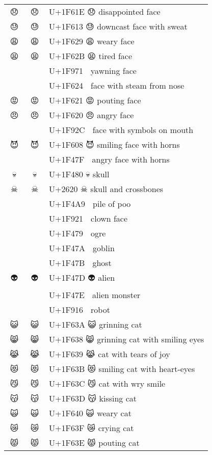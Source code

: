 \documentclass[a4paper,12pt]{article}
\newcommand{\fontA}[1]{{\fontspec[RawFeature={mode=harf,+dist,+ccmp}]{Segoe UI Emoji} #1}}
\newcommand{\fontB}[1]{{\fontspec[RawFeature={mode=harf,+dist,+ccmp}]{Noto Color Emoji} #1}}
\begin{document}
\begin{longtable}[c]{ccp{0.8\linewidth}}
\fontA{😞}&\fontB{😞}&U+1F61E 😞 disappointed face\\
\fontA{😓}&\fontB{😓}&U+1F613 😓 downcast face with sweat\\
\fontA{😩}&\fontB{😩}&U+1F629 😩 weary face\\
\fontA{😫}&\fontB{😫}&U+1F62B 😫 tired face\\
\fontA{🥱}&\fontB{🥱}&U+1F971 🥱 yawning face\\
\fontA{😤}&\fontB{😤}&U+1F624 😤 face with steam from nose\\
\fontA{😡}&\fontB{😡}&U+1F621 😡 pouting face\\
\fontA{😠}&\fontB{😠}&U+1F620 😠 angry face\\
\fontA{🤬}&\fontB{🤬}&U+1F92C 🤬 face with symbols on mouth\\
\fontA{😈}&\fontB{😈}&U+1F608 😈 smiling face with horns\\
\fontA{👿}&\fontB{👿}&U+1F47F 👿 angry face with horns\\
\fontA{💀}&\fontB{💀}&U+1F480 💀 skull\\
\fontA{☠}&\fontB{☠}&U+2620 ☠ skull and crossbones\\
\fontA{💩}&\fontB{💩}&U+1F4A9 💩 pile of poo\\
\fontA{🤡}&\fontB{🤡}&U+1F921 🤡 clown face\\
\fontA{👹}&\fontB{👹}&U+1F479 👹 ogre\\
\fontA{👺}&\fontB{👺}&U+1F47A 👺 goblin\\
\fontA{👻}&\fontB{👻}&U+1F47B 👻 ghost\\
\fontA{👽}&\fontB{👽}&U+1F47D 👽 alien\\
\fontA{👾}&\fontB{👾}&U+1F47E 👾 alien monster\\
\fontA{🤖}&\fontB{🤖}&U+1F916 🤖 robot\\
\fontA{😺}&\fontB{😺}&U+1F63A 😺 grinning cat\\
\fontA{😸}&\fontB{😸}&U+1F638 😸 grinning cat with smiling eyes\\
\fontA{😹}&\fontB{😹}&U+1F639 😹 cat with tears of joy\\
\fontA{😻}&\fontB{😻}&U+1F63B 😻 smiling cat with heart-eyes\\
\fontA{😼}&\fontB{😼}&U+1F63C 😼 cat with wry smile\\
\fontA{😽}&\fontB{😽}&U+1F63D 😽 kissing cat\\
\fontA{🙀}&\fontB{🙀}&U+1F640 🙀 weary cat\\
\fontA{😿}&\fontB{😿}&U+1F63F 😿 crying cat\\
\fontA{😾}&\fontB{😾}&U+1F63E 😾 pouting cat\\

\end{longtable}
\end{document}

